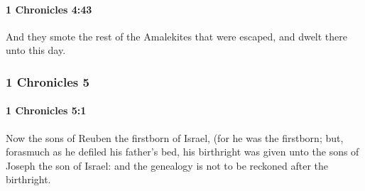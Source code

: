 		\paragraph{1 Chronicles 4:43} %
			\label{1CHRONICLES-4-43}

			And they smote the rest of the Amalekites that were escaped, and dwelt there unto this day.

	\subsubsection{1 Chronicles 5} %
		\label{1CHRONICLES-5}

		\paragraph{1 Chronicles 5:1} %
			\label{1CHRONICLES-5-1}

			Now the sons of Reuben the firstborn of Israel, (for he was the firstborn; but, forasmuch as he defiled his father’s bed, his birthright was given unto the sons of Joseph the son of Israel: and the genealogy is not to be reckoned after the birthright.

